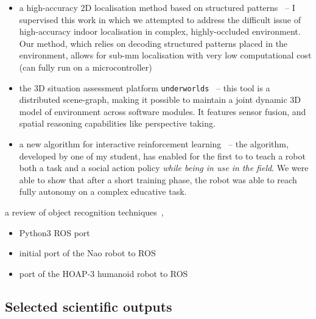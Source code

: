 \begin{itemize}
    \item a high-accuracy 2D localisation method based on structured
        patterns~\autocite{hostettler2016realtime} -- I supervised this work
        in which we attempted to address the difficult issue of high-accuracy
        indoor localisation in complex, highly-occluded environment. Our method,
        which relies on decoding structured patterns placed in the environment,
        allows for sub-mm localisation with very low computational cost (can
        fully run on a microcontroller)

    \item the 3D situation assessment platform
        \texttt{underworlds}~\autocite{lemaignan2018underworlds} -- this tool
        is a distributed scene-graph, making it possible to maintain a joint
        dynamic 3D model of environment across software modules. It features
        sensor fusion, and spatial reasoning capabilities like perspective
        taking.

    \item a new algorithm for interactive reinforcement
        learning~\autocite{senft2017supervised} -- the algorithm, developed by
        one of my student, has enabled for the first to to teach a robot both a
        task and a social action policy \emph{while being in use in the field}.
        We were able to show that after a short training phase, the robot was
        able to reach fully autonomy on a complex educative task.
\end{itemize}

     a review of object recognition
techniques~\autocite{wallbridge2017qualitative}, 

\begin{itemize}
    \item Python3 ROS port
    \item initial port of the Nao robot to ROS
    \item port of the HOAP-3 humanoid robot to ROS
\end{itemize}


\subsection{Selected scientific outputs}

